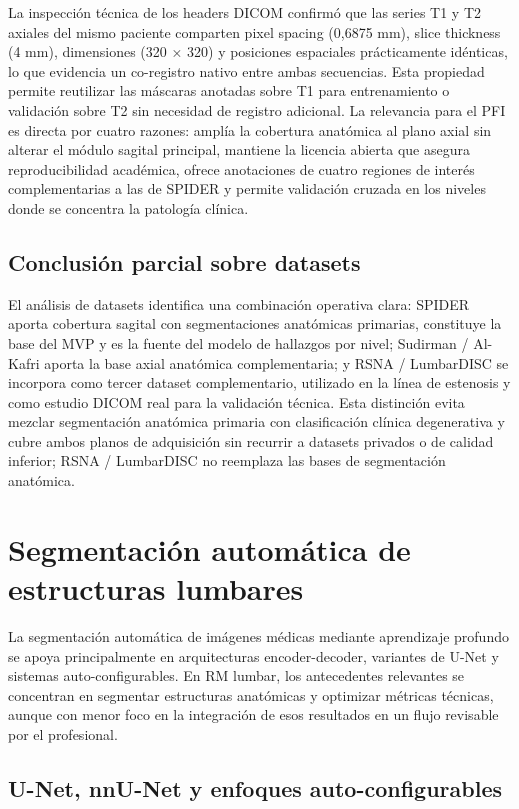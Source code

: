 La inspección técnica de los headers DICOM confirmó que las series T1 y T2 axiales del mismo paciente comparten pixel spacing (0,6875 mm), slice thickness (4 mm), dimensiones (320 × 320) y posiciones espaciales prácticamente idénticas, lo que evidencia un co-registro nativo entre ambas secuencias. Esta propiedad permite reutilizar las máscaras anotadas sobre T1 para entrenamiento o validación sobre T2 sin necesidad de registro adicional. La relevancia para el PFI es directa por cuatro razones: amplía la cobertura anatómica al plano axial sin alterar el módulo sagital principal, mantiene la licencia abierta que asegura reproducibilidad académica, ofrece anotaciones de cuatro regiones de interés complementarias a las de SPIDER y permite validación cruzada en los niveles donde se concentra la patología clínica.

\subsection{Conclusión parcial sobre datasets}

El análisis de datasets identifica una combinación operativa clara: SPIDER aporta cobertura sagital con segmentaciones anatómicas primarias, constituye la base del MVP y es la fuente del modelo de hallazgos por nivel; Sudirman / Al-Kafri aporta la base axial anatómica complementaria; y RSNA / LumbarDISC se incorpora como tercer dataset complementario, utilizado en la línea de estenosis y como estudio DICOM real para la validación técnica. Esta distinción evita mezclar segmentación anatómica primaria con clasificación clínica degenerativa y cubre ambos planos de adquisición sin recurrir a datasets privados o de calidad inferior; RSNA / LumbarDISC no reemplaza las bases de segmentación anatómica.

\section{Segmentación automática de estructuras lumbares}

La segmentación automática de imágenes médicas mediante aprendizaje profundo se apoya principalmente en arquitecturas encoder-decoder, variantes de U-Net y sistemas auto-configurables. En RM lumbar, los antecedentes relevantes se concentran en segmentar estructuras anatómicas y optimizar métricas técnicas, aunque con menor foco en la integración de esos resultados en un flujo revisable por el profesional.

\subsection{U-Net, nnU-Net y enfoques auto-configurables}

